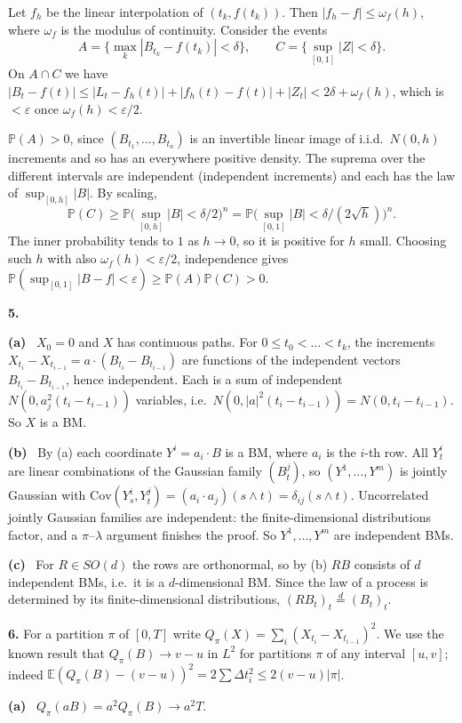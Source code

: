 \documentclass[11pt,a4paper]{article}
\newcommand{\E}{\mathbb{E}}
\renewcommand{\P}{\mathbb{P}}
\newcommand{\1}{\mathbf{1}}
\newcommand{\prob}[1]{\par\medskip\noindent\textbf{#1}\quad}
\newcommand{\sub}[1]{\par\smallskip\noindent\textbf{#1}\ }
\begin{document}
Let $f_h$ be the linear interpolation of $(t_k,f(t_k))$. Then $|f_h-f|\le\omega_f(h)$, where
$\omega_f$ is the modulus of continuity. Consider the events
\[
A=\{\max_k|B_{t_k}-f(t_k)|<\delta\},\qquad C=\{\sup_{[0,1]}|Z|<\delta\}.
\]
On $A\cap C$ we have $|B_t-f(t)|\le|L_t-f_h(t)|+|f_h(t)-f(t)|+|Z_t|<2\delta+\omega_f(h)$, which is
$<\varepsilon$ once $\omega_f(h)<\varepsilon/2$.

$\P(A)>0$, since $(B_{t_1},\dots,B_{t_n})$ is an invertible linear image of i.i.d.\ $N(0,h)$
increments and so has an everywhere positive density. The suprema over the different intervals are independent
(independent increments) and each has the law of $\sup_{[0,h]}|B|$. By scaling,
\[
\P(C)\ge\P\big(\sup_{[0,h]}|B|<\delta/2\big)^n=\P\big(\sup_{[0,1]}|B|<\delta/(2\sqrt h)\big)^n.
\]
The inner probability tends to $1$ as $h\to0$, so it is positive for $h$ small. Choosing such
$h$ with also $\omega_f(h)<\varepsilon/2$, independence gives
$\P(\sup_{[0,1]}|B-f|<\varepsilon)\ge\P(A)\P(C)>0$.

\prob{5.}
\sub{(a)} $X_0=0$ and $X$ has continuous paths. For $0\le t_0<\dots<t_k$, the increments
$X_{t_i}-X_{t_{i-1}}=a\cdot(B_{t_i}-B_{t_{i-1}})$ are functions of the independent vectors
$B_{t_i}-B_{t_{i-1}}$, hence independent. Each is a sum of independent
$N(0,a_j^2(t_i-t_{i-1}))$ variables, i.e.\ $N(0,|a|^2(t_i-t_{i-1}))=N(0,t_i-t_{i-1})$. So $X$ is a BM.

\sub{(b)} By (a) each coordinate $Y^i=a_i\cdot B$ is a BM, where $a_i$ is the $i$-th row. All $Y^i_t$ are linear combinations of the
Gaussian family $(B^j_t)$, so $(Y^1,\dots,Y^m)$ is jointly Gaussian with
$\mathrm{Cov}(Y^i_s,Y^j_t)=(a_i\cdot a_j)(s\wedge t)=\delta_{ij}(s\wedge t)$. Uncorrelated jointly Gaussian
families are independent: the finite-dimensional distributions factor, and a $\pi$--$\lambda$
argument finishes the proof. So $Y^1,\dots,Y^m$ are independent BMs.

\sub{(c)} For $R\in SO(d)$ the rows are orthonormal, so by (b) $RB$ consists of $d$ independent BMs, i.e.\
it is a $d$-dimensional BM. Since the law of a process is determined by its finite-dimensional distributions,
$(RB_t)_t\overset{d}{=}(B_t)_t$.

\prob{6.}
For a partition $\pi$ of $[0,T]$ write $Q_\pi(X)=\sum_i(X_{t_i}-X_{t_{i-1}})^2$. We use the known result
that $Q_\pi(B)\to v-u$ in $L^2$ for partitions $\pi$ of any interval $[u,v]$; indeed
$\E(Q_\pi(B)-(v-u))^2=2\sum\Delta t_i^2\le2(v-u)|\pi|$.

\sub{(a)} $Q_\pi(aB)=a^2Q_\pi(B)\to a^2T$.
\end{document}

